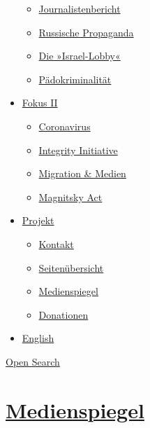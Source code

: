 \begin{itemize}
  \begin{itemize}
  \tightlist
  \item
    \href{https://swprs.org/bericht-eines-journalisten/}{Journalistenbericht}
  \item
    \href{https://swprs.org/russische-propaganda/}{Russische Propaganda}
  \item
    \href{https://swprs.org/die-israel-lobby-fakten-und-mythen/}{Die
    »Israel-Lobby«}
  \item
    \href{https://swprs.org/geopolitik-und-paedokriminalitaet/}{Pädokriminalität}
  \end{itemize}
\item
  \href{https://swprs.org/migration-und-medien/}{Fokus II}

  \begin{itemize}
  \tightlist
  \item
    \href{https://swprs.org/covid-19-hinweis-ii/}{Coronavirus}
  \item
    \href{https://swprs.org/die-integrity-initiative/}{Integrity
    Initiative}
  \item
    \href{https://swprs.org/migration-und-medien/}{Migration \& Medien}
  \item
    \href{https://swprs.org/der-fall-magnitsky/}{Magnitsky Act}
  \end{itemize}
\item
  \href{https://swprs.org/kontakt/}{Projekt}

  \begin{itemize}
  \tightlist
  \item
    \href{https://swprs.org/kontakt/}{Kontakt}
  \item
    \href{https://swprs.org/uebersicht/}{Seitenübersicht}
  \item
    \href{https://swprs.org/medienspiegel/}{Medienspiegel}
  \item
    \href{https://swprs.org/donationen/}{Donationen}
  \end{itemize}
\item
  \href{https://swprs.org/contact/}{English}
\end{itemize}

\protect\hyperlink{}{Open Search}

\hypertarget{medienspiegel}{%
\section{\texorpdfstring{\href{https://swprs.org/2017/03/01/medienspiegel/}{Medienspiegel}}{Medienspiegel}}\label{medienspiegel}}

